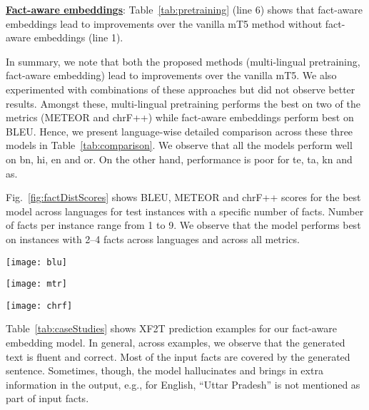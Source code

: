 \documentclass[runningheads]{llncs}
\begin{document}
\noindent\underline{\textbf{Fact-aware embeddings}}: Table~\ref{tab:pretraining} (line 6) shows that fact-aware embeddings lead to improvements over the vanilla mT5 method  without fact-aware embeddings (line 1).

In summary, we note that both the proposed methods (multi-lingual pretraining, fact-aware embedding) lead to improvements over the vanilla mT5. We also experimented with combinations of these approaches but did not observe better results. Amongst these, multi-lingual pretraining performs the best on two of the metrics (METEOR and chrF++) while fact-aware embeddings perform best on BLEU. Hence, we present language-wise detailed comparison across these three models in Table~\ref{tab:comparison}. We observe that all the models perform well on bn, hi, en and or. On the other hand, performance is poor for te, ta, kn and as.



Fig.~\ref{fig:factDistScores} shows BLEU, METEOR and chrF++ scores for the best model across languages for test instances with a specific number of facts. Number of facts per instance range from 1 to 9. We observe that the model performs best on instances with 2--4 facts across languages and across all metrics.

\begin{figure*}
\begin{minipage}{0.32\columnwidth}
 \centering
\texttt{[image: blu]}
\end{minipage}
\begin{minipage}{0.32\columnwidth}
 \centering
\texttt{[image: mtr]}
\end{minipage}
\begin{minipage}{0.32\columnwidth}
 \centering
\texttt{[image: chrf]}
\end{minipage}
\caption{BLEU (left), METEOR (middle) and chrF++ (right) scores for the best model across languages for test instances with a specific number of facts. White cells indicate absence of instances in that cell.}
\label{fig:factDistScores}
\end{figure*}

Table~\ref{tab:caseStudies} shows XF2T prediction examples for our fact-aware embedding model. In general, across examples, we observe that the generated text is fluent and correct. Most of the input facts are covered by the generated sentence. Sometimes, though, the model hallucinates and brings in extra information in the output, e.g., for English, ``Uttar Pradesh'' is not mentioned as part of input facts.
\end{document}
